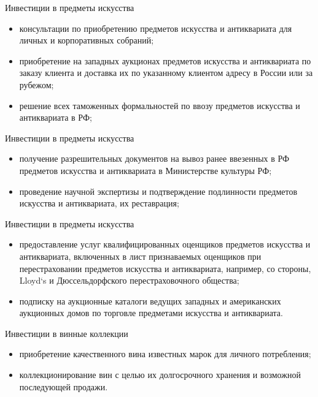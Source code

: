 \documentclass[_Banking_p3.tex]{subfiles}
\begin{document}
\begin{frame}{Инвестиции  в предметы искусства}
\begin{itemize}[<+->]
\item
консультации по приобретению предметов искусства и антиквариата для личных и корпоративных собраний;
\item
приобретение на западных аукционах предметов искусства и антиквариата по заказу клиента и доставка их по указанному клиентом адресу в России или за рубежом;
\item
решение всех таможенных формальностей по ввозу предметов искусства и антиквариата в РФ;
\end{itemize}
\end{frame}

\begin{frame}{Инвестиции  в предметы искусства}
\begin{itemize}[<+->]
\item
получение разрешительных документов на вывоз ранее ввезенных в РФ предметов искусства и антиквариата в Министерстве культуры РФ;
\item
проведение научной экспертизы и подтверждение подлинности предметов искусства и антиквариата, их реставрация;
\end{itemize}
\end{frame}

\begin{frame}{Инвестиции  в предметы искусства}
\begin{itemize}[<+->]
\item
предоставление услуг квалифицированных оценщиков предметов искусства и антиквариата, включенных в лист признаваемых оценщиков при перестраховании предметов искусства и антиквариата, например, со стороны, Lloyd`s и Дюссельдорфского перестраховочного общества;
\item
подписку на аукционные каталоги ведущих западных и американских аукционных домов по торговле предметами искусства и антиквариата.
\end{itemize}
\end{frame}

\begin{frame}{Инвестиции в винные коллекции}
\begin{itemize}[<+->]
\item
приобретение качественного вина известных марок для личного потребления;

\item
коллекционирование вин с целью их долгосрочного хранения и возможной последующей продажи.

\end{itemize}
\end{frame}
\end{document}
